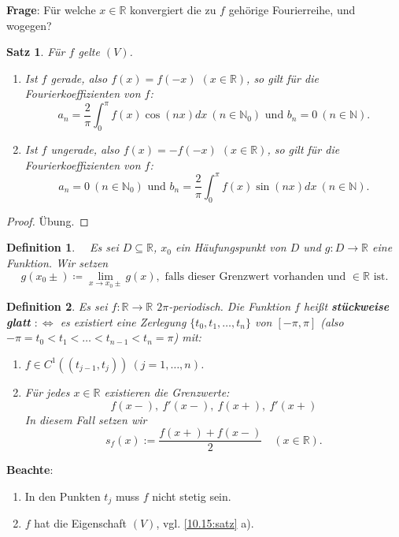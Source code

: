 \documentclass[12pt]{extreport} %
\newcommand{\N}{\mathbb{N}}
\newcommand{\R}{\mathbb{R}}
\theoremstyle{named}
\theoremstyle{itshape}
\newtheorem{satz}[unnamedtheorem]{Satz}
\newtheorem*{definition}{Definition}
\theoremstyle{normal}
\begin{document}
{\textbf{Frage}: Für welche $x \in \R$ konvergiert die zu $f$ gehörige Fourierreihe, und wogegen?

\begin{satz} \label{13.2:satz}
	Für $f$ gelte $(V)$.
	\begin{enumerate}
		\item Ist $f$ gerade, also $f(x) = f(-x)$ $(x \in \R)$, so gilt für die Fourierkoeffizienten von $f$:
			$$ a_{n} = \frac{2}{\pi} \int_{0}^{\pi} f(x) \cos(nx) dx ~ (n \in \N_0) \text{ und } b_{n} = 0 ~ (n \in \N). $$
		\item Ist $f$ ungerade, also $f(x) = -f(-x)$ $(x \in \R)$, so gilt für die Fourierkoeffizienten von $f$:
			$$ a_{n} = 0 ~ (n \in \N_0) \text{ und } b_{n} = \frac{2}{\pi} \int_{0}^{\pi} f(x) \sin(nx) dx ~ (n \in \N).  $$
	\end{enumerate}	
\end{satz}

\begin{proof}
	Übung.
\end{proof}

 
\begin{definition} ~\
Es sei $D \subseteq \R$, $x_{0}$ ein Häufungspunkt von $D$ und $g \colon D \rightarrow \R$ eine Funktion. Wir setzen
			$$ g(x_{0}\pm) \coloneqq \lim_{x \rightarrow x_{0} \pm } g(x), \text{ falls dieser Grenzwert vorhanden und $\in \R$ ist}. $$	
\end{definition}


\begin{definition}
	Es sei $f:\R \to \R$ $2\pi$-periodisch. Die Funktion $f$ hei{\ss}t \textbf{stückweise glatt} $:\iff$ es existiert eine Zerlegung $\{ t_{0}, t_{1}, \dotsc, t_{n} \}$ 
	von $[-\pi, \pi]$ (also $-\pi = t_{0} < t_{1} < \dotsc < t_{n-1} < t_{n} = \pi$) mit:
	\begin{enumerate}[label=\roman*\upshape)]
		\item $f \in C^{1} \left( (t_{j-1}, t_{j}) \right) ~(j = 1, \dotsc, n)$.
		\item Für jedes $x \in \R$ existieren die Grenzwerte:
			$$ f(x-), ~ f'(x-), ~ f(x+), ~ f'(x+) $$ 
			In diesem Fall setzen wir
			$$s_f(x):= \frac{f(x+)+f(x-)}{2} \quad (x \in \R). $$
	\end{enumerate}	
\end{definition}


\textbf{Beachte}: 
\begin{enumerate}
        \item In den Punkten $t_{j}$ muss $f$ nicht stetig sein.
	\item $f$ hat die Eigenschaft $(V)$, vgl. \ref{10.15:satz} a).   
\end{enumerate}



}
\end{document}
